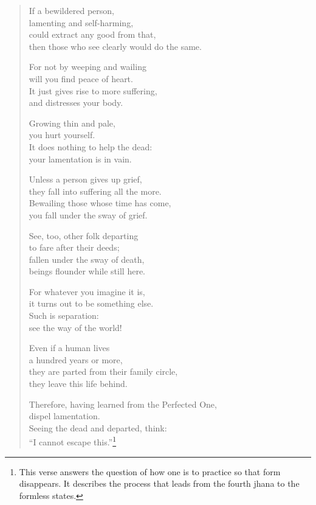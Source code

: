 \documentclass[12pt,openany]{book}%
\begin{document}
\begin{verse}
If a bewildered person, \\
lamenting and self-harming, \\
could extract any good from that, \\
then those who see clearly would do the same. 

For not by weeping and wailing \\
will you find peace of heart. \\
It just gives rise to more suffering, \\
and distresses your body. 

Growing thin and pale, \\
you hurt yourself. \\
It does nothing to help the dead: \\
your lamentation is in vain. 

Unless a person gives up grief, \\
they fall into suffering all the more. \\
Bewailing those whose time has come, \\
you fall under the sway of grief. 

See, too, other folk departing \\
to fare after their deeds; \\
fallen under the sway of death, \\
beings flounder while still here. 

For whatever you imagine it is, \\
it turns out to be something else. \\
Such is separation: \\
see the way of the world! 

Even if a human lives \\
a hundred years or more, \\
they are parted from their family circle, \\
they leave this life behind. 

Therefore, having learned from the Perfected One, \\
dispel lamentation. \\
Seeing the dead and departed, think: \\
“I cannot escape this.”\footnote{This verse answers the question of how one is to practice so that form disappears. It describes the process that leads from the fourth jhana to the formless states. } 


\end{verse}
\end{document}
